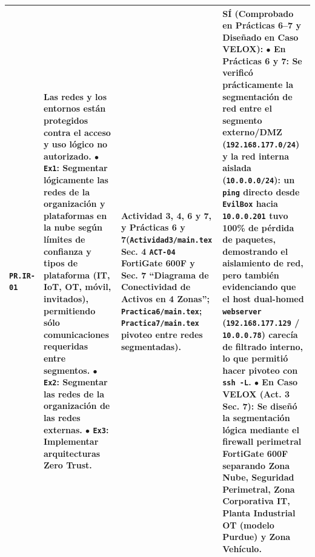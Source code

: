 \documentclass[letterpaper,11pt]{article}
\begin{document}
\begin{longtable}{|C{1.5cm}|L{5.3cm}|L{4.3cm}|L{5.8cm}|}
\texttt{PR.IR-01} &
\textbf{Las redes y los entornos están protegidos contra el acceso y uso lógico no autorizado.}\newline
$\bullet$ \texttt{Ex1}: \textbf{Segmentar lógicamente las redes de la organización y plataformas en la nube según límites de confianza y tipos de plataforma (IT, IoT, OT, móvil, invitados), permitiendo sólo comunicaciones requeridas entre segmentos}.\newline
$\bullet$ \texttt{Ex2}: Segmentar las redes de la organización de las redes externas.\newline
$\bullet$ \texttt{Ex3}: Implementar arquitecturas Zero Trust. &
\textbf{Actividad 3, 4, 6 y 7, y Prácticas 6 y 7}\newline (\texttt{Actividad3/main.tex} Sec. 4 \texttt{ACT-04} FortiGate 600F y Sec. 7 ``Diagrama de Conectividad de Activos en 4 Zonas''; \texttt{Practica6/main.tex}; \texttt{Practica7/main.tex} pivoteo entre redes segmentadas). &
\textbf{SÍ (Comprobado en Prácticas 6--7 y Diseñado en Caso VELOX):}\newline
$\bullet$ \textbf{En Prácticas 6 y 7:} Se verificó prácticamente la segmentación de red entre el segmento externo/DMZ (\texttt{192.168.177.0/24}) y la red interna aislada (\texttt{10.0.0.0/24}): un \texttt{ping} directo desde \texttt{EvilBox} hacia \texttt{10.0.0.201} tuvo \textbf{100\% de pérdida de paquetes}, demostrando el aislamiento de red, pero también evidenciando que el host dual-homed \texttt{webserver} (\texttt{192.168.177.129} / \texttt{10.0.0.78}) carecía de filtrado interno, lo que permitió hacer pivoteo con \texttt{ssh -L}.\newline
$\bullet$ \textbf{En Caso VELOX (Act. 3 Sec. 7):} Se diseñó la segmentación lógica mediante el firewall perimetral \textbf{FortiGate 600F} separando Zona Nube, Seguridad Perimetral, Zona Corporativa IT, Planta Industrial OT (modelo Purdue) y Zona Vehículo. \\
\hline


\end{longtable}
\end{document}
